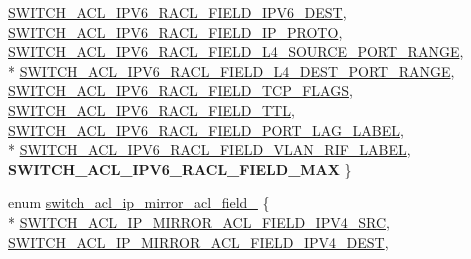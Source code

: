 \begin{DoxyCompactItemize}
\hyperlink{group__ACL_ggabaf09e557bd1549a5197e9d4c77d4f8ca22c9e18dc218b76a48832d3a114c3cd2}{S\+W\+I\+T\+C\+H\+\_\+\+A\+C\+L\+\_\+\+I\+P\+V6\+\_\+\+R\+A\+C\+L\+\_\+\+F\+I\+E\+L\+D\+\_\+\+I\+P\+V6\+\_\+\+D\+E\+S\+T}, 
\hyperlink{group__ACL_ggabaf09e557bd1549a5197e9d4c77d4f8ca4293a2fb42e5da411775b43a71b03d96}{S\+W\+I\+T\+C\+H\+\_\+\+A\+C\+L\+\_\+\+I\+P\+V6\+\_\+\+R\+A\+C\+L\+\_\+\+F\+I\+E\+L\+D\+\_\+\+I\+P\+\_\+\+P\+R\+O\+T\+O}, 
\hyperlink{group__ACL_ggabaf09e557bd1549a5197e9d4c77d4f8ca4b89072cfa15e10ed4ca31f37bc56152}{S\+W\+I\+T\+C\+H\+\_\+\+A\+C\+L\+\_\+\+I\+P\+V6\+\_\+\+R\+A\+C\+L\+\_\+\+F\+I\+E\+L\+D\+\_\+\+L4\+\_\+\+S\+O\+U\+R\+C\+E\+\_\+\+P\+O\+R\+T\+\_\+\+R\+A\+N\+G\+E}, 
\\*
\hyperlink{group__ACL_ggabaf09e557bd1549a5197e9d4c77d4f8ca91bc6177bf396a3810cbe3bcd2014b72}{S\+W\+I\+T\+C\+H\+\_\+\+A\+C\+L\+\_\+\+I\+P\+V6\+\_\+\+R\+A\+C\+L\+\_\+\+F\+I\+E\+L\+D\+\_\+\+L4\+\_\+\+D\+E\+S\+T\+\_\+\+P\+O\+R\+T\+\_\+\+R\+A\+N\+G\+E}, 
\hyperlink{group__ACL_ggabaf09e557bd1549a5197e9d4c77d4f8cae7d276a82a3a226fed17b1f9e9145f1d}{S\+W\+I\+T\+C\+H\+\_\+\+A\+C\+L\+\_\+\+I\+P\+V6\+\_\+\+R\+A\+C\+L\+\_\+\+F\+I\+E\+L\+D\+\_\+\+T\+C\+P\+\_\+\+F\+L\+A\+G\+S}, 
\hyperlink{group__ACL_ggabaf09e557bd1549a5197e9d4c77d4f8cad554f78eac4b85b604bbc6b173c855f6}{S\+W\+I\+T\+C\+H\+\_\+\+A\+C\+L\+\_\+\+I\+P\+V6\+\_\+\+R\+A\+C\+L\+\_\+\+F\+I\+E\+L\+D\+\_\+\+T\+T\+L}, 
\hyperlink{group__ACL_ggabaf09e557bd1549a5197e9d4c77d4f8ca095894b84f9f3689881befe57d8a4970}{S\+W\+I\+T\+C\+H\+\_\+\+A\+C\+L\+\_\+\+I\+P\+V6\+\_\+\+R\+A\+C\+L\+\_\+\+F\+I\+E\+L\+D\+\_\+\+P\+O\+R\+T\+\_\+\+L\+A\+G\+\_\+\+L\+A\+B\+E\+L}, 
\\*
\hyperlink{group__ACL_ggabaf09e557bd1549a5197e9d4c77d4f8ca5e029883c0d50fc16839e7a7292e778f}{S\+W\+I\+T\+C\+H\+\_\+\+A\+C\+L\+\_\+\+I\+P\+V6\+\_\+\+R\+A\+C\+L\+\_\+\+F\+I\+E\+L\+D\+\_\+\+V\+L\+A\+N\+\_\+\+R\+I\+F\+\_\+\+L\+A\+B\+E\+L}, 
{\bfseries S\+W\+I\+T\+C\+H\+\_\+\+A\+C\+L\+\_\+\+I\+P\+V6\+\_\+\+R\+A\+C\+L\+\_\+\+F\+I\+E\+L\+D\+\_\+\+M\+A\+X}
 \}
\item 
enum \hyperlink{group__ACL_gaceebbef0581567ba589780ab1457b6ad}{switch\+\_\+acl\+\_\+ip\+\_\+mirror\+\_\+acl\+\_\+field\+\_\+} \{ \\*
\hyperlink{group__ACL_ggaceebbef0581567ba589780ab1457b6ada04259732b7154689272702816c05ce9a}{S\+W\+I\+T\+C\+H\+\_\+\+A\+C\+L\+\_\+\+I\+P\+\_\+\+M\+I\+R\+R\+O\+R\+\_\+\+A\+C\+L\+\_\+\+F\+I\+E\+L\+D\+\_\+\+I\+P\+V4\+\_\+\+S\+R\+C}, 
\hyperlink{group__ACL_ggaceebbef0581567ba589780ab1457b6adaf0e8bae046bae60649cad781acd5437a}{S\+W\+I\+T\+C\+H\+\_\+\+A\+C\+L\+\_\+\+I\+P\+\_\+\+M\+I\+R\+R\+O\+R\+\_\+\+A\+C\+L\+\_\+\+F\+I\+E\+L\+D\+\_\+\+I\+P\+V4\+\_\+\+D\+E\+S\+T}, 

\end{DoxyCompactItemize}
